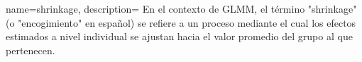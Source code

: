{
    name=shrinkage,
    description={
        En el contexto de \gls{GLMM}, el término "shrinkage" (o "encogimiento" en español)
        se refiere a un proceso mediante el cual los efectos estimados a nivel individual se ajustan hacia el valor promedio del grupo al que pertenecen.}
}

\printglossaries